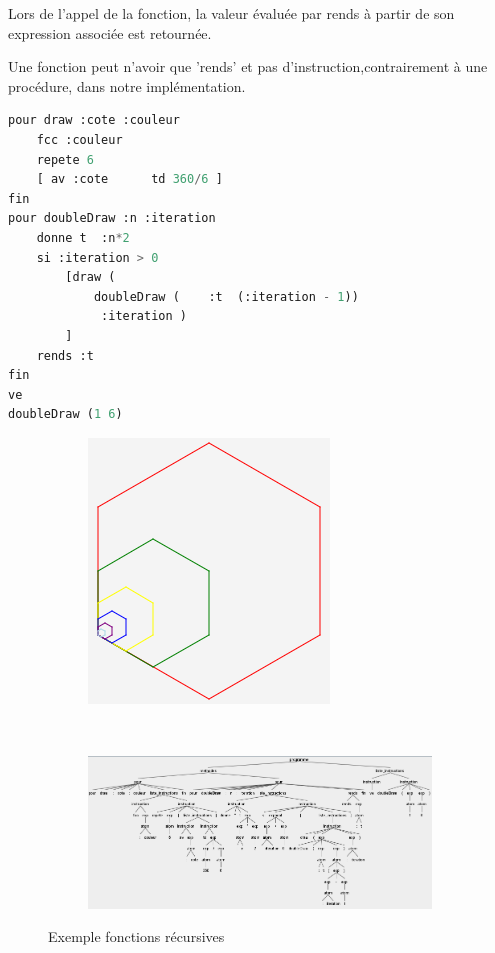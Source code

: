 \documentclass[a4paper,11pt]{article}
\begin{document}
Lors de l'appel de la fonction, la valeur évaluée par rends à partir de son expression associée est retournée.

Une fonction peut n'avoir que 'rends' et pas d'instruction,contrairement à une procédure, dans notre implémentation.

\begin{lstlisting}[language=Python]
pour draw :cote :couleur
	fcc :couleur
	repete 6 
	[ av :cote  	td 360/6 ]
fin
pour doubleDraw :n :iteration
	donne t  :n*2
	si :iteration > 0 
		[draw (
			doubleDraw (	:t  (:iteration - 1))
			 :iteration )
		]
	rends :t
fin
ve
doubleDraw (1 6)
\end{lstlisting}
\begin{figure}[!h]
	\centering
	\begin{subfigure}[t]{.2\textwidth}
		\includegraphics[width=\textwidth]{img/function_figure}
	\end{subfigure}
	~
	\begin{subfigure}[t]{\textwidth}
		\includegraphics[width=\textwidth]{img/function_tree}
	\end{subfigure}
	\caption{Exemple fonctions récursives}
\end{figure}

\end{document}
